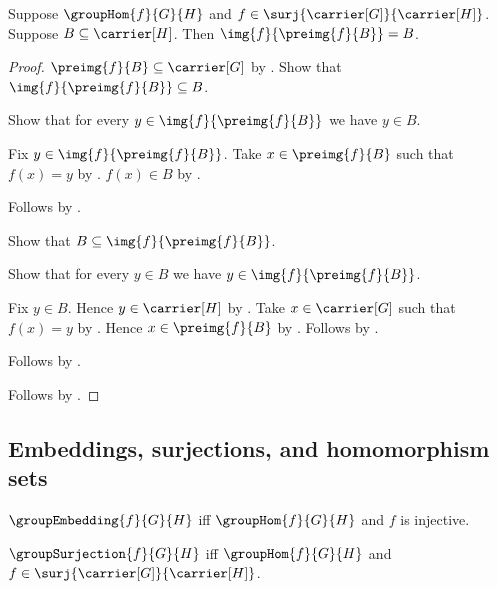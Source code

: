 \begin{theorem}\label{surjective_group_hom_image_preimage_eq}
    Suppose $\groupHom{f}{G}{H}$ and
        $f\in\surj{\carrier[G]}{\carrier[H]}$.
    Suppose $B\subseteq\carrier[H]$.
    Then $\img{f}{\preimg{f}{B}}=B$.
\end{theorem}
\begin{proof}
    $\preimg{f}{B}\subseteq\carrier[G]$ by
        .
    Show that $\img{f}{\preimg{f}{B}}\subseteq B$.
    \begin{subproof}
        Show that for every $y\in\img{f}{\preimg{f}{B}}$ we have
            $y\in B$.
        \begin{subproof}
            Fix $y\in\img{f}{\preimg{f}{B}}$.
            Take $x\in\preimg{f}{B}$ such that $f(x)=y$ by
                .
            $f(x)\in B$ by .
        \end{subproof}
        Follows by .
    \end{subproof}
    Show that $B\subseteq\img{f}{\preimg{f}{B}}$.
    \begin{subproof}
        Show that for every $y\in B$ we have
            $y\in\img{f}{\preimg{f}{B}}$.
        \begin{subproof}
            Fix $y\in B$.
            Hence $y\in\carrier[H]$ by .
            Take $x\in\carrier[G]$ such that $f(x)=y$ by
                .
            Hence $x\in\preimg{f}{B}$ by
                .
            Follows by .
        \end{subproof}
        Follows by .
    \end{subproof}
    Follows by .
\end{proof}

\subsection{Embeddings, surjections, and homomorphism sets}

\begin{definition}\label{group_embedding}
    $\groupEmbedding{f}{G}{H}$ iff
        $\groupHom{f}{G}{H}$ and $f$ is injective.
\end{definition}

\begin{definition}\label{group_surjection}
    $\groupSurjection{f}{G}{H}$ iff
        $\groupHom{f}{G}{H}$ and
        $f\in\surj{\carrier[G]}{\carrier[H]}$.
\end{definition}

